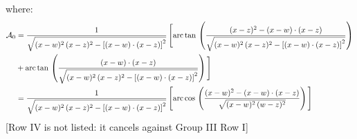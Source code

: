 \documentclass[9pt]{article}
\numberwithin{equation}{section}
\begin{document}
where: \begin{align}
\mathcal{A}_{0} & = \frac{1}{\sqrt{(x-w)^{2}\,(x-z)^{2}-\left[(x-w)\cdot (x-z)\right]^{2}}}\, \Bigg[\mathrm{arc\,tan}\,\left(\frac{(x-z)^{2}-(x-w)\cdot (x-z)}{\sqrt{(x-w)^{2}\,(x-z)^{2}-\left[(x-w)\cdot (x-z)\right]^{2}}}\right)\notag \\ & + \mathrm{arc\,tan}\,\left(\frac{(x-w)\cdot (x-z)}{\sqrt{(x-w)^{2}\,(x-z)^{2}-\left[(x-w)\cdot (x-z)\right]^{2}}}\right) \Bigg]\notag \\ & = \frac{1}{\sqrt{(x-w)^{2}\,(x-z)^{2}-\left[(x-w)\cdot (x-z)\right]^{2}}}\, \Bigg[\mathrm{arc\,cos}\,\left(\frac{(x-w)^{2}-(x-w)\cdot (x-z)}{\sqrt{(x-w)^{2}\,(w-z)^{2}}}\right)\Bigg]
\end{align} {\color{red}[Row IV is not listed: it cancels against Group III Row I]}\par\noindent
\end{document}

